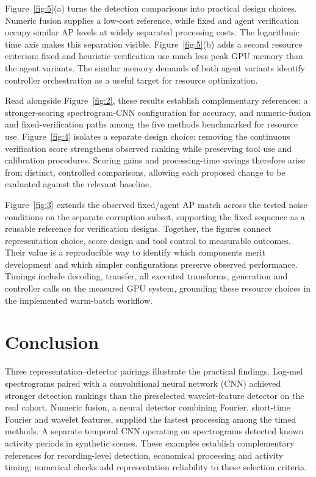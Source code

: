 \documentclass[11pt,letterpaper]{article}
\begin{document}
Figure~\ref{fig:5}(a) turns the detection comparisons into practical design choices. Numeric fusion supplies a low-cost reference, while fixed and agent verification occupy similar AP levels at widely separated processing costs. The logarithmic time axis makes this separation visible. Figure~\ref{fig:5}(b) adds a second resource criterion: fixed and heuristic verification use much less peak GPU memory than the agent variants. The similar memory demands of both agent variants identify controller orchestration as a useful target for resource optimization.\par

Read alongside Figure~\ref{fig:2}, these results establish complementary references: a stronger-scoring spectrogram-CNN configuration for accuracy, and numeric-fusion and fixed-verification paths among the five methods benchmarked for resource use. Figure~\ref{fig:4} isolates a separate design choice: removing the continuous verification score strengthens observed ranking while preserving tool use and calibration procedures. Scoring gains and processing-time savings therefore arise from distinct, controlled comparisons, allowing each proposed change to be evaluated against the relevant baseline.\par

Figure~\ref{fig:3} extends the observed fixed/agent AP match across the tested noise conditions on the separate corruption subset, supporting the fixed sequence as a reusable reference for verification designs. Together, the figures connect representation choice, score design and tool control to measurable outcomes. Their value is a reproducible way to identify which components merit development and which simpler configurations preserve observed performance. Timings include decoding, transfer, all executed transforms, generation and controller calls on the measured GPU system, grounding these resource choices in the implemented warm-batch workflow.\par

\clearpage

\section{Conclusion}

Three representation--detector pairings illustrate the practical findings. Log-mel spectrograms paired with a convolutional neural network (CNN) achieved stronger detection rankings than the preselected wavelet-feature detector on the real cohort. Numeric fusion, a neural detector combining Fourier, short-time Fourier and wavelet features, supplied the fastest processing among the timed methods. A separate temporal CNN operating on spectrograms detected known activity periods in synthetic scenes. These examples establish complementary references for recording-level detection, economical processing and activity timing; numerical checks add representation reliability to these selection criteria.\par
\end{document}

